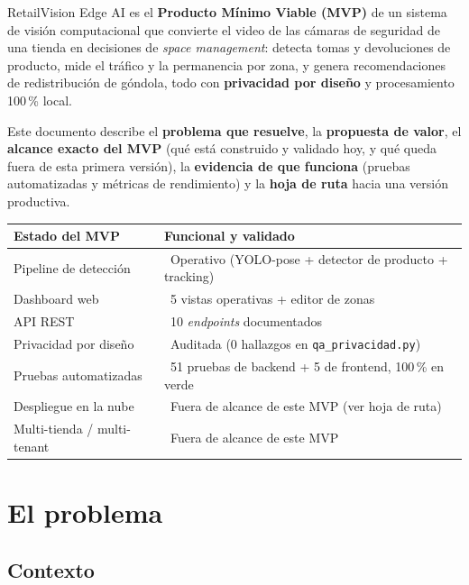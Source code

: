 \documentclass[11pt,a4paper]{report}
\newcommand{\rvcheck}{\textcolor{rvGreen}{\textbf{\checkmark}}}
\newcommand{\rvcross}{\textcolor{rvRed}{\textbf{\texttimes}}}
\begin{document}
RetailVision Edge AI es el \textbf{Producto Mínimo Viable (MVP)} de un sistema de visión
computacional que convierte el video de las cámaras de seguridad de una tienda en decisiones de
\textit{space management}: detecta tomas y devoluciones de producto, mide el tráfico y la
permanencia por zona, y genera recomendaciones de redistribución de góndola, todo con
\textbf{privacidad por diseño} y procesamiento 100\,\% local.

Este documento describe el \textbf{problema que resuelve}, la \textbf{propuesta de valor}, el
\textbf{alcance exacto del MVP} (qué está construido y validado hoy, y qué queda fuera de esta
primera versión), la \textbf{evidencia de que funciona} (pruebas automatizadas y métricas de
rendimiento) y la \textbf{hoja de ruta} hacia una versión productiva.

\begin{center}
\renewcommand{\arraystretch}{1.3}
\begin{tabular}{>{\raggedright\arraybackslash}p{4.2cm} >{\raggedright\arraybackslash}p{9.8cm}}
\toprule
\rowcolor{rvCodeBg}\textbf{Estado del MVP} & \textbf{Funcional y validado} \\
\midrule
Pipeline de detección & \rvcheck\ Operativo (YOLO-pose + detector de producto + tracking) \\
Dashboard web & \rvcheck\ 5 vistas operativas + editor de zonas \\
API REST & \rvcheck\ 10 \textit{endpoints} documentados \\
Privacidad por diseño & \rvcheck\ Auditada (0 hallazgos en \texttt{qa\_privacidad.py}) \\
Pruebas automatizadas & \rvcheck\ 51 pruebas de backend + 5 de frontend, 100\,\% en verde \\
Despliegue en la nube & \rvcross\ Fuera de alcance de este MVP (ver hoja de ruta) \\
Multi-tienda / multi-tenant & \rvcross\ Fuera de alcance de este MVP \\
\bottomrule
\end{tabular}
\end{center}

\chapter{El problema}

\section{Contexto}
\end{document}
